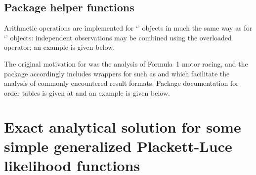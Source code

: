 \documentclass[article]{jss}
\begin{document}
\subsection{Package helper functions}

Arithmetic operations are implemented for `' objects in
much the same way as for `' objects: independent
observations may be combined using the overloaded \code{+} operator;
an example is given below.

The original motivation for  was the analysis of
Formula~1 motor racing, and the package accordingly includes wrappers for
 such as  and
 which facilitate the analysis of commonly
encountered result formats.  Package documentation for order tables is
given at  and an example is given below.

\section{Exact analytical solution for some simple generalized Plackett-Luce likelihood functions}
\end{document}
